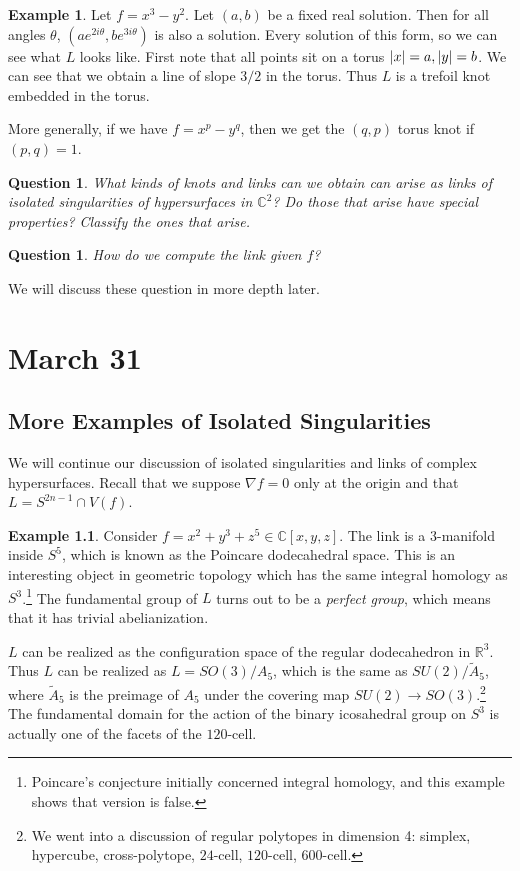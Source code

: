 \documentclass[leqno, openany]{memoir}
\newtheorem{quest}[thm]{Question}
\theoremstyle{definition}
\newtheorem{exm}[thm]{Example}
\theoremstyle{remark}
\theoremstyle{plain}
\theoremstyle{definition}
\theoremstyle{remark}
\newcommand{\R}{\mathbb{R}}
\renewcommand{\C}{\mathbb{C}}
\begin{document}
\begin{exm}
    Let $f = x^3 - y^2$. Let $(a,b)$ be a fixed real solution. Then for all angles $\theta$, $(ae^{2i\theta}, be^{3i\theta})$ is also a solution. Every solution of this form, so we can see what $L$ looks like. First note that all points sit on a torus $\abs{x} = a, \abs{y} = b$. We can see that we obtain a line of slope $3/2$ in the torus. Thus $L$ is a trefoil knot embedded in the torus.

    More generally, if we have $f = x^p - y^q$, then we get the $(q,p)$ torus knot if $(p,q) = 1$. 
\end{exm}

\begin{quest}
    What kinds of knots and links can we obtain can arise as links of isolated singularities of hypersurfaces in $\C^2$? Do those that arise have special properties? Classify the ones that arise.
\end{quest}

\begin{quest}
    How do we compute the link given $f$?
\end{quest}

We will discuss these question in more depth later.

\chapter{March 31}%
\label{cha:march_31}

\section{More Examples of Isolated Singularities}%
\label{sec:more_examples_of_isolated_singularities}

We will continue our discussion of isolated singularities and links of complex hypersurfaces. Recall that we suppose $\nabla f = 0$ only at the origin and that $L = S^{2n-1} \cap V(f)$.

\begin{exm}
    Consider $f = x^2 + y^3 + z^5 \in \C[x,y,z]$. The link is a $3$-manifold inside $S^5$, which is known as the Poincare dodecahedral space. This is an interesting object in geometric topology which has the same integral homology as $S^3$.\footnote{Poincare's conjecture initially concerned integral homology, and this example shows that version is false.} The fundamental group of $L$ turns out to be a \textit{perfect group}, which means that it has trivial abelianization.

    $L$ can be realized as the configuration space of the regular dodecahedron in $\R^3$. Thus $L$ can be realized as $L = SO(3)/A_5$, which is the same as $SU(2) / \widetilde{A}_5$, where $\widetilde{A}_5$ is the preimage of $A_5$ under the covering map $SU(2) \to SO(3)$.\footnote{We went into a discussion of regular polytopes in dimension 4: simplex, hypercube, cross-polytope, $24$-cell, $120$-cell, $600$-cell.} The fundamental domain for the action of the binary icosahedral group on $S^3$ is actually one of the facets of the $120$-cell.
\end{exm}
\end{document}
